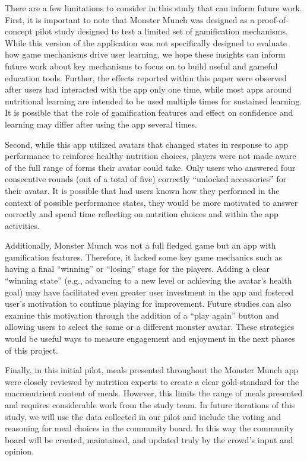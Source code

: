 There are a few limitations to consider in this study that can inform future work. First, it is important to note that Monster Munch was designed as a proof-of-concept pilot study designed to test a limited set of gamification mechanisms. While this version of the application was not specifically designed to evaluate how game mechanisms drive user learning, we hope these insights can inform future work about key mechanisms to focus on to build useful and gameful education tools. Further, the effects reported within this paper were observed after users had interacted with the app only one time, while most apps around nutritional learning are intended to be used multiple times for sustained learning. It is possible that the role of gamification features and effect on confidence and learning may differ after using the app several times.

Second, while this app utilized avatars that changed states in response to app performance to reinforce healthy nutrition choices, players were not made aware of the full range of forms their avatar could take. Only users who answered four consecutive rounds (out of a total of five) correctly ``unlocked accessories'' for their avatar. It is possible that had users known how they performed in the context of possible performance states, they would be more motivated to answer correctly and spend time reflecting on nutrition choices and within the app activities. 

Additionally, Monster Munch was not a full fledged game but an app with gamification features. Therefore, it lacked some key game mechanics such as having a final ``winning'' or ``losing'' stage for the players. Adding a clear ``winning state'' (e.g., advancing to a new level or achieving the avatar's health goal) may have facilitated even greater user investment in the app and fostered user's motivation to continue playing for improvement. 
Future studies can also examine this motivation through the addition of a ``play again'' button and allowing users to select the same or a different monster avatar. 
These strategies would be useful ways to measure engagement and enjoyment in the next phases of this project.  

Finally, in this initial pilot, meals presented throughout the Monster Munch app were closely reviewed by nutrition experts to create a clear gold-standard for the macronutrient content of meals. 
However, this limits the range of meals presented and requires considerable work from the study team. In future iterations of this study, we will use the data collected in our pilot and include the voting and reasoning for meal choices in the community board. In this way the community board will be created, maintained, and updated truly by the crowd's input and opinion.  

